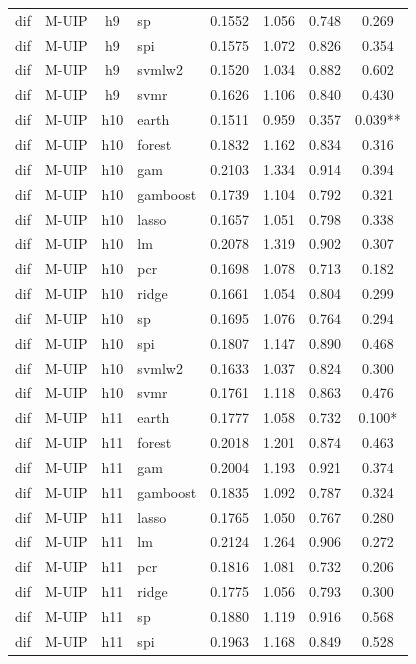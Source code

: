 \begin{ThreePartTable}
\begin{longtable}[t]{llclcccc}
dif & M-UIP & h9 & sp & 0.1552 & 1.056 & 0.748 & 0.269\\
dif & M-UIP & h9 & spi & 0.1575 & 1.072 & 0.826 & 0.354\\
dif & M-UIP & h9 & svmlw2 & 0.1520 & 1.034 & 0.882 & 0.602\\
dif & M-UIP & h9 & svmr & 0.1626 & 1.106 & 0.840 & 0.430\\
\addlinespace
dif & M-UIP & h10 & earth & 0.1511 & 0.959 & 0.357 & 0.039**\\
dif & M-UIP & h10 & forest & 0.1832 & 1.162 & 0.834 & 0.316\\
dif & M-UIP & h10 & gam & 0.2103 & 1.334 & 0.914 & 0.394\\
dif & M-UIP & h10 & gamboost & 0.1739 & 1.104 & 0.792 & 0.321\\
dif & M-UIP & h10 & lasso & 0.1657 & 1.051 & 0.798 & 0.338\\
dif & M-UIP & h10 & lm & 0.2078 & 1.319 & 0.902 & 0.307\\
dif & M-UIP & h10 & pcr & 0.1698 & 1.078 & 0.713 & 0.182\\
dif & M-UIP & h10 & ridge & 0.1661 & 1.054 & 0.804 & 0.299\\
dif & M-UIP & h10 & sp & 0.1695 & 1.076 & 0.764 & 0.294\\
dif & M-UIP & h10 & spi & 0.1807 & 1.147 & 0.890 & 0.468\\
dif & M-UIP & h10 & svmlw2 & 0.1633 & 1.037 & 0.824 & 0.300\\
dif & M-UIP & h10 & svmr & 0.1761 & 1.118 & 0.863 & 0.476\\
\addlinespace
dif & M-UIP & h11 & earth & 0.1777 & 1.058 & 0.732 & 0.100*\\
dif & M-UIP & h11 & forest & 0.2018 & 1.201 & 0.874 & 0.463\\
dif & M-UIP & h11 & gam & 0.2004 & 1.193 & 0.921 & 0.374\\
dif & M-UIP & h11 & gamboost & 0.1835 & 1.092 & 0.787 & 0.324\\
dif & M-UIP & h11 & lasso & 0.1765 & 1.050 & 0.767 & 0.280\\
dif & M-UIP & h11 & lm & 0.2124 & 1.264 & 0.906 & 0.272\\
dif & M-UIP & h11 & pcr & 0.1816 & 1.081 & 0.732 & 0.206\\
dif & M-UIP & h11 & ridge & 0.1775 & 1.056 & 0.793 & 0.300\\
dif & M-UIP & h11 & sp & 0.1880 & 1.119 & 0.916 & 0.568\\
dif & M-UIP & h11 & spi & 0.1963 & 1.168 & 0.849 & 0.528\\

\end{longtable}
\end{ThreePartTable}
